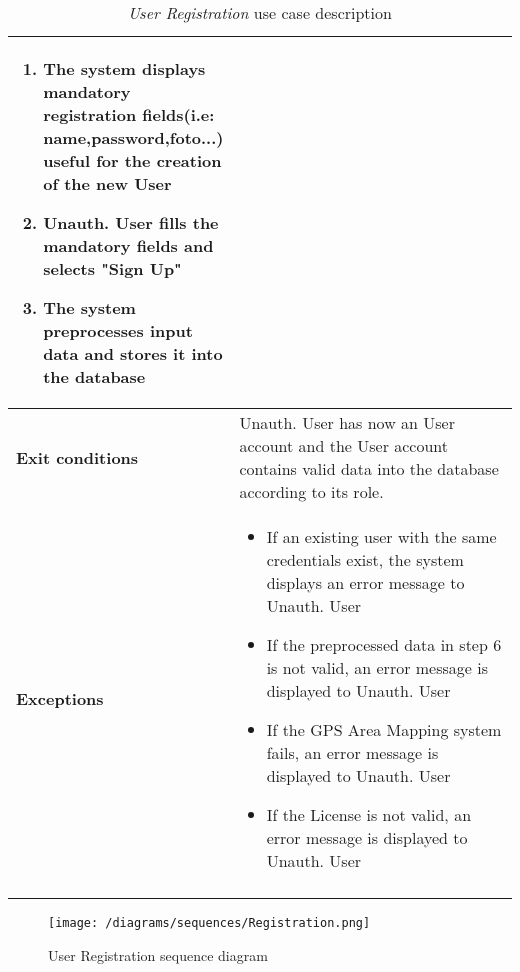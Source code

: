\begin{enumerate}
\begin{longtable}{p{0.26\linewidth}p{0.75\linewidth}}
\begin{enumerate}
\begin{enumerate}
						\end{enumerate}
						\item The system displays mandatory registration fields(i.e: name,password,foto...) useful for the creation of the new User
						\item Unauth. User fills the mandatory fields and selects "Sign Up"
						\item The system preprocesses input data and stores it into the database
					\end{enumerate} \\
					\midrule
					\textbf{Exit conditions} & Unauth. User has now an User account and the User account contains valid data into the database according to its role.\\
					\midrule
					\textbf{Exceptions} & 
					\begin{itemize}
						\item If an existing user with the same credentials exist, the system displays an error message to Unauth. User
						\item If the preprocessed data in step 6 is not valid,  an error message is displayed to 
						Unauth. User
						\item If the GPS Area Mapping system fails, an error message is displayed to Unauth. User
						\item If the License is not valid, an error message is displayed to Unauth. User
					\end{itemize} \\
					\bottomrule
					\caption{\emph{User Registration} use case description}
				\end{longtable}
			
				\begin{figure}[h]
					\centering
					\texttt{[image: /diagrams/sequences/Registration.png]}
					\caption{User Registration sequence diagram}
				\end{figure}
				

\end{enumerate}
